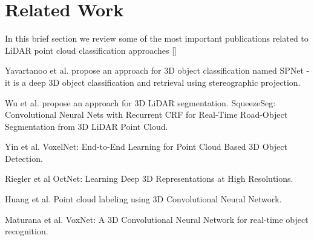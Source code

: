 \section{Related Work}

In this brief section we review some of the most important publications related to LiDAR point cloud classification approaches []


Yavartanoo et al. \cite{DBLP:journals/corr/abs-1811-01571} propose an approach for 3D object classification  named SPNet - it is a deep 3D object classification and retrieval using stereographic projection. 

Wu et al. \cite{DBLP:conf/icra/WuWYK18} propose an approach for 3D LiDAR segmentation. 
SqueezeSeg: Convolutional Neural Nets with Recurrent {CRF} for Real-Time Road-Object Segmentation from 3D LiDAR Point Cloud. 



Yin et al. \cite{Zhou_2018_CVPR}  VoxelNet: End-to-End Learning for Point Cloud Based 3D Object Detection. 


Riegler et al \cite{DBLP:conf/cvpr/RieglerUG17} OctNet: Learning Deep 3D Representations at High Resolutions.  
 

Huang et al. \cite{DBLP:conf/icpr/HuangY16}  Point cloud labeling using 3D Convolutional Neural Network. 


Maturana et al. \cite{DBLP:conf/iros/MaturanaS15}  VoxNet: {A} 3D Convolutional Neural Network for real-time object recognition.




